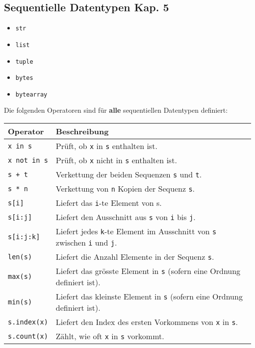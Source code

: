 \subsection[Sequentielle Datentypen]{Sequentielle Datentypen \tiny{Kap. 5}}
\begin{itemize}
	\item \texttt{str}
	\item \texttt{list}
	\item \texttt{tuple}
	\item \texttt{bytes}
	\item \texttt{bytearray}
\end{itemize}
Die folgenden Operatoren sind für \textbf{alle} sequentiellen Datentypen definiert:\\
\begin{tabular}{|l|l|}
	\hline 
	\textbf{Operator} &\textbf{Beschreibung}\\ 
	\hline 
	\texttt{x in s} &Prüft, ob \texttt{x} in \texttt{s} enthalten ist.\\ 
	\texttt{x not in s} &Prüft, ob \texttt{x} nicht in \texttt{s} enthalten ist.\\
	\texttt{s + t} &Verkettung der beiden Sequenzen \texttt{s} und \texttt{t}.\\ 
	\texttt{s * n} &Verkettung von \texttt{n} Kopien der Sequenz \texttt{s}.\\ 
	\texttt{s[i]} &Liefert das \texttt{i}-te Element von s.\\ 
	\texttt{s[i:j]} &Liefert den Ausschnitt aus \texttt{s} von \texttt{i} bis \texttt{j}.\\
	\texttt{s[i:j:k]} &Liefert jedes \texttt{k}-te Element im Ausschnitt von \texttt{s} zwischen \texttt{i} und \texttt{j}.\\
	\texttt{len(s)} &Liefert die Anzahl Elemente in der Sequenz \texttt{s}.\\
	\texttt{max(s)} &Liefert das grösste Element in \texttt{s} (sofern eine Ordnung definiert ist).\\
	\texttt{min(s)} &Liefert das kleinste Element in \texttt{s} (sofern eine Ordnung definiert ist).\\
	\texttt{s.index(x)} &Liefert den Index des ersten Vorkommens von \texttt{x} in \texttt{s}.\\
	\texttt{s.count(x)} &Zählt, wie oft \texttt{x} in \texttt{s} vorkommt.\\
	\hline 
\end{tabular}

